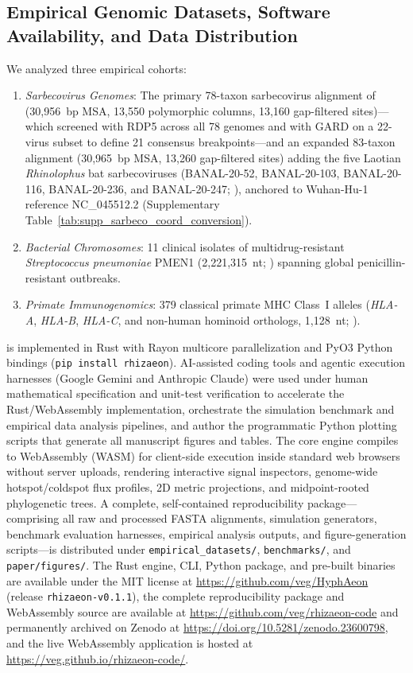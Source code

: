 \subsection{Empirical Genomic Datasets, Software Availability, and Data Distribution}
\label{subsec:methods_empirical}
We analyzed three empirical cohorts:
\begin{enumerate}
\item \emph{Sarbecovirus Genomes}: The primary 78-taxon sarbecovirus alignment of \citet{lytras2022exploring} (30,956~bp MSA, 13,550 polymorphic columns, 13,160 gap-filtered sites)—which \citet{lytras2022exploring} screened with RDP5 across all 78 genomes and with GARD on a 22-virus subset to define 21 consensus breakpoints—and an expanded 83-taxon alignment (30,965~bp MSA, 13,260 gap-filtered sites) adding the five Laotian \textit{Rhinolophus} bat sarbecoviruses (BANAL-20-52, BANAL-20-103, BANAL-20-116, BANAL-20-236, and BANAL-20-247; \citealt{temmam2022bat}), anchored to Wuhan-Hu-1 reference NC\_045512.2 (Supplementary Table~\ref{tab:supp_sarbeco_coord_conversion}).
\item \emph{Bacterial Chromosomes}: 11 clinical isolates of multidrug-resistant \textit{Streptococcus pneumoniae} PMEN1 (2,221,315~nt; \citealt{croucher2011rapid}) spanning global penicillin-resistant outbreaks.
\item \emph{Primate Immunogenomics}: 379 classical primate MHC Class~I alleles (\textit{HLA-A}, \textit{HLA-B}, \textit{HLA-C}, and non-human hominoid orthologs, 1,128~nt; \citealt{maccari2017ipd}).
\end{enumerate}

\RhizAeon is implemented in Rust with Rayon multicore parallelization and PyO3 Python bindings (\texttt{pip install rhizaeon}). AI-assisted coding tools and agentic execution harnesses (Google Gemini and Anthropic Claude) were used under human mathematical specification and unit-test verification to accelerate the Rust/WebAssembly implementation, orchestrate the simulation benchmark and empirical data analysis pipelines, and author the programmatic Python plotting scripts that generate all manuscript figures and tables. The core engine compiles to WebAssembly (WASM) for client-side execution inside standard web browsers without server uploads, rendering interactive signal inspectors, genome-wide hotspot/coldspot flux profiles, 2D metric projections, and midpoint-rooted phylogenetic trees. A complete, self-contained reproducibility package—comprising all raw and processed FASTA alignments, simulation generators, benchmark evaluation harnesses, empirical analysis outputs, and figure-generation scripts—is distributed under \texttt{empirical\_datasets/}, \texttt{benchmarks/}, and \texttt{paper/figures/}. The Rust engine, CLI, Python package, and pre-built binaries are available under the MIT license at \url{https://github.com/veg/HyphAeon} (release \texttt{rhizaeon-v0.1.1}), the complete reproducibility package and WebAssembly source are available at \url{https://github.com/veg/rhizaeon-code} and permanently archived on Zenodo at \href{https://doi.org/10.5281/zenodo.23600798}{https://doi.org/10.5281/zenodo.23600798}, and the live WebAssembly application is hosted at \url{https://veg.github.io/rhizaeon-code/}.

